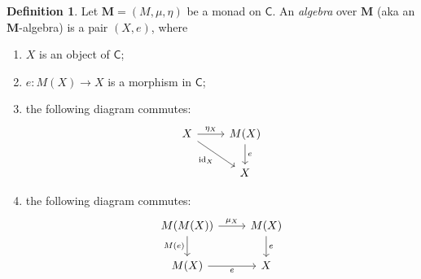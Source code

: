 \documentclass{article}
\theoremstyle{definition}
\newtheorem{defn}{Definition}
\newcommand{\C}{\mathsf{C}}
\newcommand{\M}{\mathbf{M}}
\DeclareMathOperator{\id}{id}
\begin{document}
\begin{defn}
Let $\M = (M,\mu,\eta)$ be a monad on $\C$. An \emph{algebra} over $\M$ (aka an $\M$-algebra) is a pair $(X,e)$, where
\begin{enumerate}[label = (\roman*.)]
    \item $X$ is an object of $\C$;
    \item $e : M(X) \to X$ is a morphism in $\C$;
    \item the following diagram commutes:
    \[\begin{tikzcd}[ampersand replacement=\&]
    	X \& {M(X)} \\
    	\& X
    	\arrow["{\eta_X}", from=1-1, to=1-2]
    	\arrow["e", from=1-2, to=2-2]
    	\arrow["{\id_X}"', from=1-1, to=2-2]
    \end{tikzcd}\]
    \item the following diagram commutes:
    \[\begin{tikzcd}[ampersand replacement=\&]
    	{M(M(X))} \& {M(X)} \\
    	{M(X)} \& X
    	\arrow["{\mu_X}", from=1-1, to=1-2]
    	\arrow["e", from=1-2, to=2-2]
    	\arrow["{M(e)}"', from=1-1, to=2-1]
    	\arrow["e"', from=2-1, to=2-2]
    \end{tikzcd}\]
\end{enumerate}
\end{defn}
\end{document}
